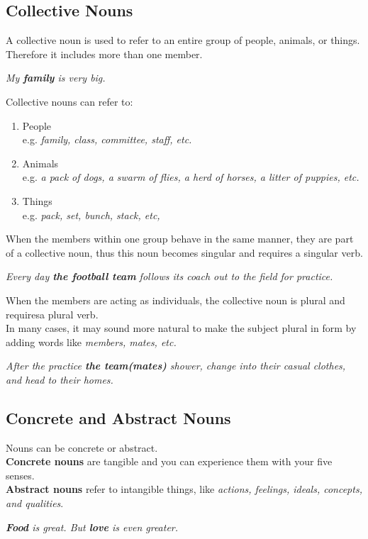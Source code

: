 \documentclass[hidelinks,10pt,a4paper]{article}
\begin{document}
\subsection{Collective Nouns}
A collective noun is used to refer to an entire group of people, animals, or things.\\
Therefore it includes more than one member.

\begin{center}
		\textit{My \textbf{family} is very big.}
\end{center}

Collective nouns can refer to:
\begin{enumerate}[label=\alph*)]
		\item People\\
				e.g. \textit{family, class, committee, staff, etc.}
		\item Animals\\
				e.g. \textit{a pack of dogs, a swarm of flies, a herd of horses, a litter of puppies, etc.}
		\item Things\\
				e.g. \textit{pack, set, bunch, stack, etc,}
\end{enumerate}
\newpage
When the members within one group behave in the same manner, they are part of a collective noun, thus this noun becomes singular and requires a singular verb.
\begin{center}
		\textit{Every day \textbf{the football team} follows its coach out to the field for practice.}
\end{center}

When the members are acting as individuals, the collective noun is plural and requiresa plural verb.\\
In many cases, it may sound more natural to make the subject plural in form by adding words like \textit{members, mates, etc.}
\begin{center}
		\textit{After the practice \textbf{the team(mates)} shower, change into their casual clothes, and head to their homes.}
\end{center}

\subsection{Concrete and Abstract Nouns}
\hspace{0.8cm} Nouns can be concrete or abstract. \\
\textbf{Concrete nouns} are tangible and you can experience them with your five senses.\\
\textbf{Abstract nouns} refer to intangible things, like \textit{actions, feelings, ideals, concepts, and qualities}.
\begin{center}
		\textit{ \textbf{Food} is great. But \textbf{love} is even greater.}
\end{center}
\end{document}
